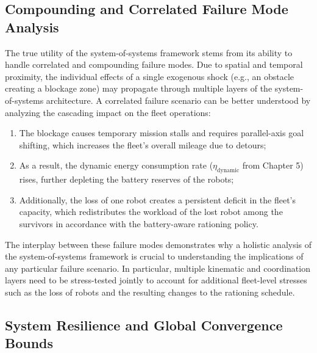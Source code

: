 \subsection{Compounding and Correlated Failure Mode Analysis}

The true utility of the system-of-systems framework stems from its ability to handle correlated and compounding failure modes. Due to spatial and temporal proximity, the individual effects of a single exogenous shock (e.g., an obstacle creating a blockage zone) may propagate through multiple layers of the system-of-systems architecture. A correlated failure scenario can be better understood by analyzing the cascading impact on the fleet operations:
\begin{enumerate}
    \item The blockage causes temporary mission stalls and requires parallel-axis goal shifting, which increases the fleet's overall mileage due to detours;
    \item As a result, the dynamic energy consumption rate ($\eta_{\text{dynamic}}$ from Chapter 5) rises, further depleting the battery reserves of the robots;
    \item Additionally, the loss of one robot creates a persistent deficit in the fleet's capacity, which redistributes the workload of the lost robot among the survivors in accordance with the battery-aware rationing policy.
\end{enumerate}
The interplay between these failure modes demonstrates why a holistic analysis of the system-of-systems framework is crucial to understanding the implications of any particular failure scenario. In particular, multiple kinematic and coordination layers need to be stress-tested jointly to account for additional fleet-level stresses such as the loss of robots and the resulting changes to the rationing schedule.

\subsection{System Resilience and Global Convergence Bounds}

